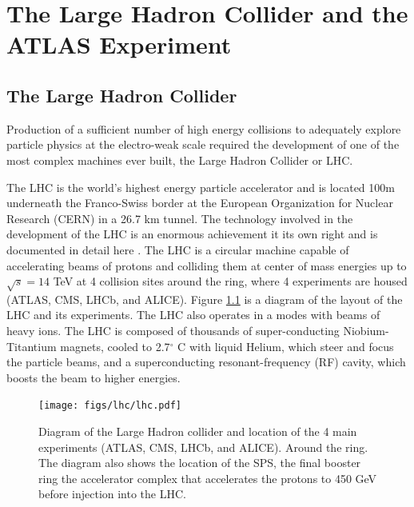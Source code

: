 \chapter[The Large Hadron Collider and the ATLAS Experiment][The Large Hadron Collider and the ATLAS Experiment]{The Large Hadron Collider and the ATLAS Experiment}
\label{chapter:lhc}
\section{The Large Hadron Collider}


Production of a sufficient number of high energy collisions to adequately explore
particle physics at the electro-weak scale required the development of one
of the most complex machines ever built, the Large Hadron Collider or LHC. 

The LHC is the world's highest energy particle accelerator 
and is located 100m underneath the Franco-Swiss border at the European Organization
for Nuclear Research (CERN) in a 26.7 km tunnel. The technology involved in the development of the LHC is an enormous achievement
it its own right and is documented in detail here \cite{1748-0221-3-08-S08001,Pettersson:291782,Linnecar:1176380}. 
The LHC is a circular machine capable of accelerating beams of protons and colliding them at center of mass 
energies up to $\sqrt{s} = 14$ TeV at 4 collision sites around the ring, where 4 experiments
are housed (ATLAS\cite{ATLAS_detector}, CMS\cite{1748-0221-3-08-S08004}, LHCb\cite{1748-0221-3-08-S08005}, and ALICE\cite{1748-0221-3-08-S08002}). Figure \ref{figure:lhc_lhc} is a diagram
of the layout of the LHC and its experiments\cite{Team:40525}. The LHC also operates in a modes with beams of 
heavy ions. The LHC is composed of thousands of super-conducting Niobium-Titantium 
magnets, cooled to 2.7$^\circ$ C with liquid Helium, which steer and focus the 
particle beams, and a superconducting resonant-frequency (RF) cavity, which boosts the beam
to higher energies. 

\begin{figure}[!t]
\centering 
\texttt{[image: figs/lhc/lhc.pdf]}
\caption{ Diagram of the Large Hadron collider and location of the 4 main experiments (ATLAS, CMS, LHCb, and ALICE). Around
  the ring. The diagram also shows the location of the SPS, the final booster ring the accelerator complex that accelerates
    the protons to 450 GeV before injection into the LHC. 
}
\label{figure:lhc_lhc}
\end{figure}



